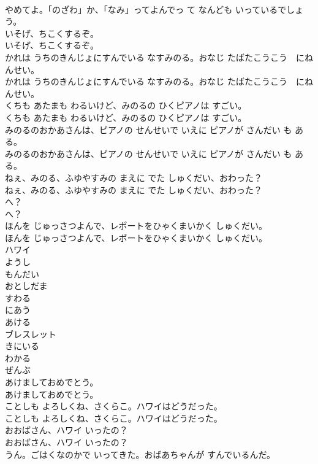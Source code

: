 \documentclass[8pt]{extreport}
\begin{document}
\begin{CJK}{UTF8}{min}
\\	やめてよ。「のざわ」か、「なみ」ってよんでっ て なんども いっているでしょう。
\\	いそげ、ちこくするぞ。
\\	いそげ、ちこくするぞ。
\\	かれは うちのきんじょにすんでいる なすみのる。おなじ たばたこうこう　にねんせい。
\\	かれは うちのきんじょにすんでいる なすみのる。おなじ たばたこうこう　にねんせい。
\\	くちも あたまも わるいけど、みのるの ひくピアノは すごい。
\\	くちも あたまも わるいけど、みのるの ひくピアノは すごい。
\\	みのるのおかあさんは、ピアノの せんせいで いえに ピアノが さんだい も ある。
\\	みのるのおかあさんは、ピアノの せんせいで いえに ピアノが さんだい も ある。
\\	ねぇ、みのる、ふゆやすみの まえに でた しゅくだい、おわった？
\\	ねぇ、みのる、ふゆやすみの まえに でた しゅくだい、おわった？
\\	へ？
\\	へ？
\\	ほんを じゅっさつよんで、レポートをひゃくまいかく しゅくだい。
\\	ほんを じゅっさつよんで、レポートをひゃくまいかく しゅくだい。
\\	ハワイ
\\	ようし
\\	もんだい
\\	おとしだま
\\	すわる
\\	にあう
\\	あける
\\	ブレスレット
\\	きにいる
\\	わかる
\\	ぜんぶ
\\	あけましておめでとう。
\\	あけましておめでとう。
\\	ことしも よろしくね、さくらこ。ハワイはどうだった。
\\	ことしも よろしくね、さくらこ。ハワイはどうだった。
\\	おおばさん、ハワイ いったの？
\\	おおばさん、ハワイ いったの？
\\	うん。ごはくなのかで いってきた。おばあちゃんが すんでいるんだ。

\end{CJK}
\end{document}

